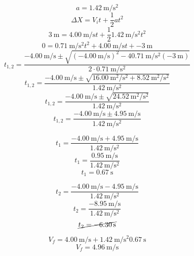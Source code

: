 \documentclass[../practica.root.tex]{subfiles}
\begin{document}
\begin{enumerate}
\begin{enumerate}
\begin{center}
			            \[ a = \SI{1,42}{\meter\per\second\squared}\]
			            \[ \Delta X = V_it + \frac{1}{2}at^2 \]
			            \[ \SI{3}{\meter} = \SI{4,00}{\meter\per\second}t + \frac{1}{2}\SI{1,42}{\meter\per\second\squared}t^2 \]
			            \[ 0 = \SI{0,71}{\meter\per\second\squared}t^2 + \SI{4,00}{\meter\per\second}t + \SI{-3}{\meter} \]
			            \[
				            t_{1,2} = \frac{
					            \SI{-4,00}{\m/\s} \pm \sqrt{ (\SI{-4,00}{\m/\s})^2 - \num{4}\SI{0,71}{\m/\s^2}(\SI{-3}{\m}) }
				            }{
					            \num{2}\cdot\SI{0,71}{\meter\per\second\squared}
				            }
			            \]\[
				            t_{1,2} = \frac{
					            \SI{-4,00}{\m/\s} \pm \sqrt{ \SI{16,00}{\m^2/\s^2} + \SI{8,52}{\m^2/\s^2} }
				            }{
					            \SI{1,42}{\m/\s^2}
				            }
			            \]\[
				            t_{1,2} = \frac{
					            \SI{-4,00}{\m/\s} \pm \sqrt{ \SI{24,52}{\m^2/\s^2} }
				            }{
					            \SI{1,42}{\m/\s^2}
				            }
			            \]\[
				            t_{1,2} = \frac{
					            \SI{-4,00}{\m/\s} \pm \SI{4,95}{\m/\s}
				            }{
					            \SI{1,42}{\m/\s^2}
				            }
			            \]
			            \begin{multicols}{2}
				            \begin{center}
					            \[
						            t_1 = \frac{
							            \SI{-4,00}{\m/\s} + \SI{4,95}{\m/\s}
						            }{
							            \SI{1,42}{\m/\s^2}
						            }
					            \]\[
						            t_1 = \frac{
							            \SI{0,95}{\m/\s}
						            }{
							            \SI{1,42}{\m/\s^2}
						            }
					            \]
					            \[ t_1 = \SI{0,67}{\s} \]
				            \end{center}
				            \begin{center}
					            \[
						            t_2 = \frac{
							            \SI{-4,00}{\m/\s} - \SI{4,95}{\m/\s}
						            }{
							            \SI{1,42}{\m/\s^2}
						            }
					            \]\[
						            t_2 = \frac{
							            \SI{-8,95}{\m/\s}
						            }{
							            \SI{1,42}{\m/\s^2}
						            }
					            \]\[
						            \cancel{t_2 = \SI{-6,30}{\s}}
					            \]
				            \end{center}
			            \end{multicols}
			            \[ V_f = \SI{4,00}{\meter\per\second} + \SI{1,42}{\meter\per\second\squared}\SI{0,67}{\s} \]
			            \[ \boxed{V_f = \SI{4,96}{\meter\per\second}} \]
		            \end{center}
	      \end{enumerate}


\end{enumerate}
\end{document}
